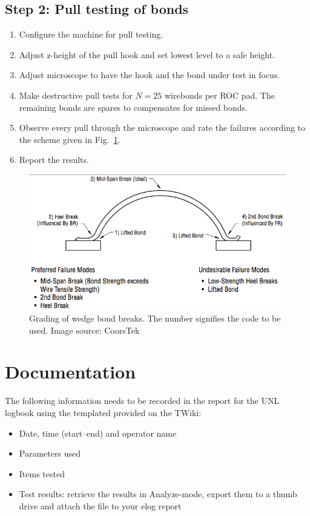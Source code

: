 \documentclass[10pt]{unlsilabsop}
\begin{document}
\subsection{Step 2: Pull testing of bonds}
\begin{enumerate}
    \item Configure the machine for pull testing.
    \item Adjust z-height of the pull hook and set lowest level to a safe height.
    \item Adjust microscope to have the hook and the bond under test in focus.
    \item Make destructive pull tests for $N=25$ wirebonds per ROC pad. The remaining bonds are spares to compensates for missed bonds.
    \item Observe every pull through the microscope and rate the failures according to the scheme given in Fig.~\ref{fig:grading}.
    \item Report the results.
\end{enumerate}

\begin{figure}[h]
    \begin{center}
        \includegraphics[width=12cm]{img/GradingWedgeBondBreaks.png}
        \caption{Grading of wedge bond breaks. The number signifies the code to be used. Image source: CoorsTek}
        \label{fig:grading}
    \end{center}
\end{figure}

\section{Documentation}
The following information needs to be recorded in the report for the UNL logbook using the templated provided on the TWiki:
\begin{itemize}
\item Date, time (start--end) and operator name
\item Parameters used
\item Items tested
\item Test results: retrieve the results in Analyze-mode, export them to a thumb drive and attach the file to your elog report
\end{itemize}
\end{document}

